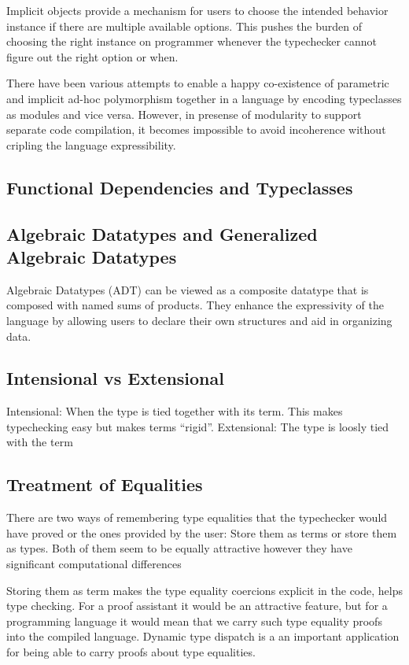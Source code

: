 \documentclass[manuscript,screen,nonacm]{acmart}
\begin{document}
Implicit objects\cite{oliveira_typeclasses_2010} provide a mechanism for users to choose the intended behavior instance if there are multiple available options. This pushes the burden of choosing the right instance on programmer whenever the typechecker cannot figure out the right option or when.

There have been various attempts\cite{jones_modular_1996, dreyer_modular_2007, wehr_ml_2008, white_modular_2014} to enable a happy co-existence of parametric and implicit ad-hoc polymorphism together in a language by encoding typeclasses as modules and vice versa. However, in presense of modularity to support separate code compilation, it becomes impossible to avoid incoherence without cripling the language expressibility.


\subsection{Functional Dependencies and Typeclasses}

\subsection{Algebraic Datatypes and Generalized Algebraic Datatypes}
Algebraic Datatypes (ADT) can be viewed as a composite datatype that is composed with named sums of products. They enhance the expressivity of the language by allowing users to declare their own structures and aid in organizing data. 

\subsection{Intensional vs Extensional}
Intensional: When the type is tied together with its term. This makes typechecking easy but makes terms ``rigid''.
Extensional: The type is loosly tied with the term

\subsection{Treatment of Equalities}
There are two ways of remembering type equalities that the typechecker would have proved or the ones provided by the user: Store them as terms or store them as types. Both of them seem to be equally attractive however they have significant computational differences

Storing them as term makes the type equality coercions explicit in the code, helps type checking. For a proof assistant it would be an attractive feature, but for a programming language it would mean that we carry such
type equality proofs into the compiled language. Dynamic type dispatch is a an important application for being able to carry proofs about type equalities.
\end{document}
